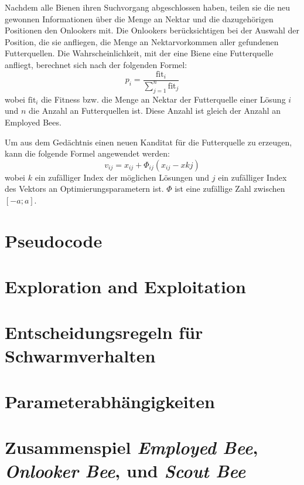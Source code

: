 Nachdem alle Bienen ihren Suchvorgang abgeschlossen haben, teilen sie die
neu gewonnen Informationen über die Menge an Nektar und die dazugehörigen
Positionen den Onlookers mit. Die Onlookers berücksichtigen bei der Auswahl der
Position, die sie anfliegen, die Menge an Nektarvorkommen aller gefundenen
Futterquellen. Die Wahrscheinlichkeit, mit der eine Biene eine Futterquelle
anfliegt, berechnet sich nach der folgenden Formel:
\begin{equation}
    p_i = \frac{\mathrm{fit}_i}{\sum_{j=1}^n \mathrm{fit}_j}
\end{equation}
wobei $\mathrm{fit}_i$ die Fitness bzw. die Menge an Nektar der Futterquelle
einer Lösung $i$ und $n$ die Anzahl an Futterquellen ist. Diese Anzahl ist
gleich der Anzahl an Employed Bees.

Um aus dem Gedächtnis einen neuen Kanditat für die Futterquelle zu erzeugen,
kann die folgende Formel angewendet werden:
\begin{equation}
    v_{ij} = x_{ij} + \Phi_{ij}(x_{ij} - x{kj})
\end{equation}
wobei $k$ ein zufälliger Index der möglichen Lösungen und $j$ ein zufälliger
Index des Vektors an Optimierungsparametern ist. $\Phi$ ist eine zufällige
Zahl zwischen $[-a;a]$.

\section{Pseudocode}

\section{Exploration and Exploitation}

\section{Entscheidungsregeln für Schwarmverhalten}

\section{Parameterabhängigkeiten}

\section{Zusammenspiel \emph{Employed Bee}, \emph{Onlooker Bee}, und
    \emph{Scout Bee}}